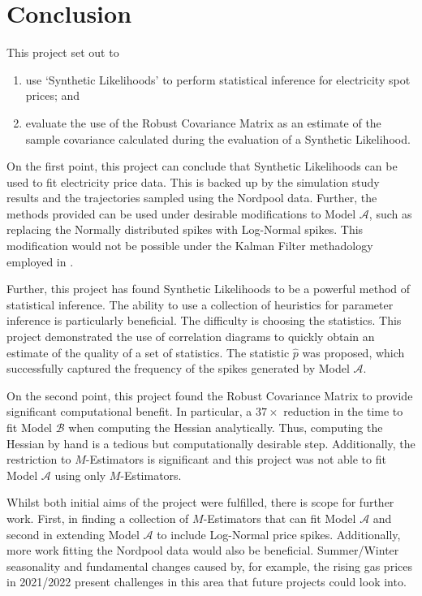 \section{Conclusion}
\label{sec:eval}

This project set out to

\begin{enumerate}
    \item use `Synthetic Likelihoods' \citep{wood_2010} to perform statistical inference for electricity spot prices; and
    \item evaluate the use of the Robust Covariance Matrix \citep{huber_1967} as an estimate of the sample covariance calculated during the evaluation of a Synthetic Likelihood.
\end{enumerate}

On the first point, this project can conclude that Synthetic Likelihoods can be used to fit electricity price data. This is backed up by the simulation study results and the trajectories sampled using the Nordpool data. Further, the methods provided can be used under desirable modifications to Model $\mathcal{A}$, such as replacing the Normally distributed spikes with Log-Normal spikes. This modification would not be possible under the Kalman Filter methadology employed in \cite{huisman_mahieu_2003}.

Further, this project has found Synthetic Likelihoods to be a powerful method of statistical inference. The ability to use a collection of heuristics for parameter inference is particularly beneficial. The difficulty is choosing the statistics. This project demonstrated the use of correlation diagrams to quickly obtain an estimate of the quality of a set of statistics. The statistic $\hat{p}$ was proposed, which successfully captured the frequency of the spikes generated by Model $\mathcal{A}$.

On the second point, this project found the Robust Covariance Matrix to provide significant computational benefit. In particular, a $37 \times$ reduction in the time to fit Model $\mathcal{B}$ when computing the Hessian analytically. Thus, computing the Hessian by hand is a tedious but computationally desirable step. Additionally, the restriction to $M$-Estimators is significant and this project was not able to fit Model $\mathcal{A}$ using only $M$-Estimators.

Whilst both initial aims of the project were fulfilled, there is scope for further work. First, in finding a collection of $M$-Estimators that can fit Model $\mathcal{A}$ and second in extending Model $\mathcal{A}$ to include Log-Normal price spikes. Additionally, more work fitting the Nordpool data would also be beneficial. Summer/Winter seasonality and fundamental changes caused by, for example, the rising gas prices in 2021/2022 present challenges in this area that future projects could look into.

